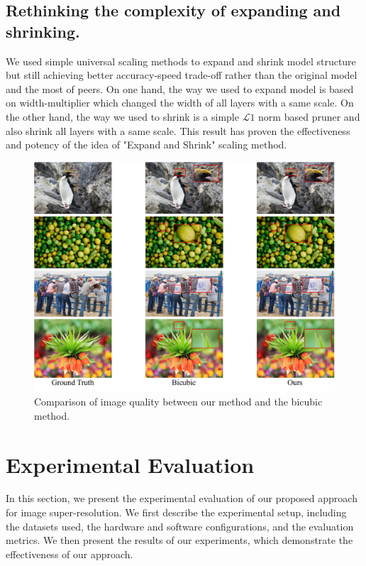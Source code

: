 \documentclass[10pt,twocolumn,letterpaper]{article}
\begin{document}
\subsection{Rethinking the complexity of expanding and shrinking.}

We used simple universal scaling methods to expand and shrink model structure but still achieving better accuracy-speed trade-off rather than the original model and the most of peers. On one hand, the way we used to expand model is based on width-multiplier which changed the width of all layers with a same scale. On the other hand, the way we used to shrink is a simple $\mathcal{L}1$ norm based pruner and also shrink all layers with a same scale. This result has proven the effectiveness and potency of the idea of "Expand and Shrink" scaling method.

\begin{figure}[t]
    \begin{center}
    \includegraphics[width=\textwidth]{../x4result.pdf}
    \end{center}
    \caption{Comparison of image quality between our method and the bicubic method.}
    \label{yolov3}
\end{figure}

\section{Experimental Evaluation}
\label{sec:exp}
In this section, we present the experimental evaluation of our proposed approach for image super-resolution. We first describe the experimental setup, including the datasets used, the hardware and software configurations, and the evaluation metrics. We then present the results of our experiments, which demonstrate the effectiveness of our approach.
\end{document}
